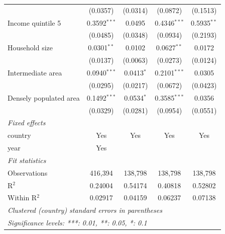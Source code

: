 \begin{tabular}{lcccc}
                              & (0.0357)       & (0.0314)      & (0.0872)       & (0.1513)\\   
   Income quintile 5          & 0.3592$^{***}$ & 0.0495        & 0.4346$^{***}$ & 0.5935$^{**}$\\   
                              & (0.0485)       & (0.0348)      & (0.0934)       & (0.2193)\\   
   Household size             & 0.0301$^{**}$  & 0.0102        & 0.0627$^{**}$  & 0.0172\\   
                              & (0.0137)       & (0.0063)      & (0.0273)       & (0.0124)\\   
   Intermediate area          & 0.0940$^{***}$ & 0.0413$^{*}$  & 0.2101$^{***}$ & 0.0305\\   
                              & (0.0295)       & (0.0217)      & (0.0672)       & (0.0423)\\   
   Densely populated area     & 0.1492$^{***}$ & 0.0534$^{*}$  & 0.3585$^{***}$ & 0.0356\\   
                              & (0.0329)       & (0.0281)      & (0.0954)       & (0.0551)\\   
   \midrule
   \emph{Fixed effects}\\
   country                    & Yes            & Yes           & Yes            & Yes\\  
   year                       & Yes            &               &                & \\  
   \midrule
   \emph{Fit statistics}\\
   Observations               & 416,394        & 138,798       & 138,798        & 138,798\\  
   R$^2$                      & 0.24004        & 0.54174       & 0.40818        & 0.52802\\  
   Within R$^2$               & 0.02917        & 0.04159       & 0.06237        & 0.07138\\  
   \midrule \midrule
   \multicolumn{5}{l}{\emph{Clustered (country) standard errors in parentheses}}\\
   \multicolumn{5}{l}{\emph{Significance levels: ***: 0.01, **: 0.05, *: 0.1}}\\
\end{tabular}
\par\endgroup


